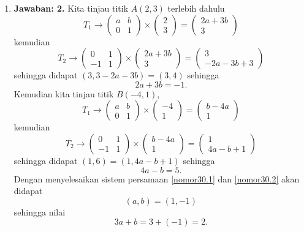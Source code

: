 \begin{enumerate}
\item \textbf{Jawaban: 2.} Kita tinjau titik $A(2,3)$ terlebih dahulu \[T_1 \longrightarrow \begin{pmatrix}a & b\\0 & 1\end{pmatrix}\times\begin{pmatrix}2\\3\end{pmatrix} = \begin{pmatrix}2a + 3b\\3\end{pmatrix}\]kemudian\[T_2\longrightarrow \begin{pmatrix}0 & 1\\ -1 & 1\end{pmatrix}\times\begin{pmatrix}2a + 3b\\ 3\end{pmatrix} = \begin{pmatrix}3 \\ -2a-3b+3\end{pmatrix}\]sehingga didapat $(3, 3-2a-3b) = (3,4)$ sehingga \begin{equation}\label{nomor30.1}2a+3b = -1.\end{equation} Kemudian kita tinjau titik $B(-4,1)$, \[T_1 \longrightarrow \begin{pmatrix} a & b\\ 0 & 1\end{pmatrix}\times\begin{pmatrix}-4\\1\end{pmatrix} = \begin{pmatrix}b - 4a\\1\end{pmatrix}\]kemudian\[T_2 \longrightarrow \begin{pmatrix} 0&1\\-1&1\end{pmatrix}\times\begin{pmatrix}b-4a\\1\end{pmatrix} = \begin{pmatrix}1 \\ 4a -b +1\end{pmatrix}\]sehingga didapat $(1,6) = (1, 4a-b+1)$ sehingga \begin{equation}\label{nomor30.2}4a-b = 5.\end{equation}Dengan menyelesaikan sistem persamaan \eqref{nomor30.1} dan \eqref{nomor30.2} akan didapat \[(a,b) = (1,-1)\] sehingga nilai \[3a+b = 3 + (-1) = 2.\]


\end{enumerate}
